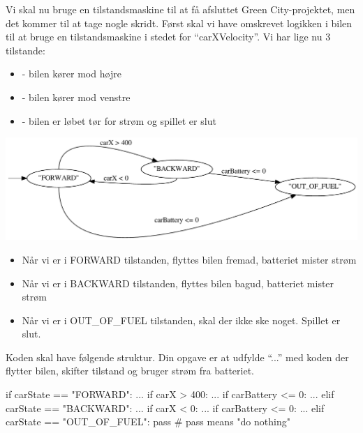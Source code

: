 \documentclass{ucph-handout}
\newcounter{handout}
\newcommand{\Ark}{Ark \#\arabic{handout} -- }
\renewcommand{\Title}{\Ark Tegn med Processing.py}%
\begin{document}
\newpage
{}
\renewcommand{\Title}{\Ark Tilstandsmaskiner (Finite state machines)}
\begin{exercisebox}[adjusted title=Tilstand for bilen]
Vi skal nu bruge en tilstandsmaskine til at få afsluttet
Green City-projektet, men det kommer til at tage nogle skridt. Først skal vi
have omskrevet logikken i bilen til at bruge en tilstandsmaskine i
stedet for ``carXVelocity''. Vi har lige nu 3 tilstande:
\begin{itemize}
\item {} - bilen kører mod højre
\item {} - bilen kører mod venstre
\item {} - bilen er løbet tør for strøm og spillet er slut
\end{itemize}
\begin{center}
\includegraphics[width=\textwidth]{../illustrations/graphviz/carStateMachine_simple}
\end{center}

\begin{itemize}
\item Når vi er i FORWARD tilstanden, flyttes bilen fremad, batteriet
  mister strøm
\item Når vi er i BACKWARD tilstanden, flyttes bilen bagud, batteriet mister strøm
\item Når vi er i OUT\_OF\_FUEL tilstanden, skal der ikke ske noget. Spillet er slut.
\end{itemize}

Koden skal have følgende struktur. Din opgave er at udfylde ``...''
med koden der flytter bilen, skifter tilstand og bruger strøm fra
batteriet.
\begin{python}
    if carState == "FORWARD":
        ...
        if carX > 400:
            ...
        if carBattery <= 0:
            ...
    elif carState == "BACKWARD":
        ...
        if carX < 0:
            ...
        if carBattery <= 0:
            ...
    elif carState == "OUT_OF_FUEL":
        pass # pass means "do nothing"
\end{python}
\end{exercisebox}
\end{document}
